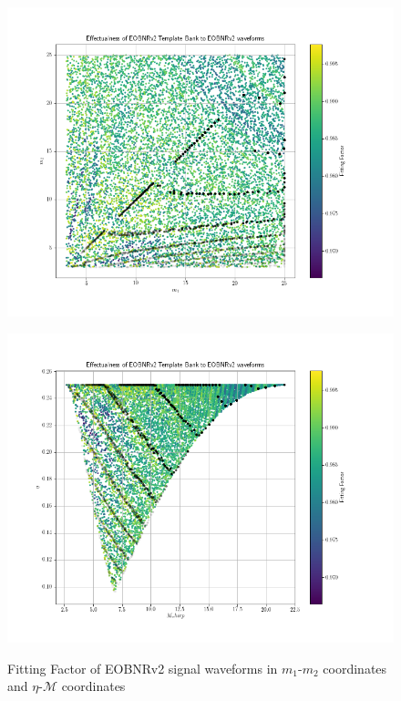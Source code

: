 \documentclass{article}
\begin{document}
\begin{figure}[h]
    \begin{minipage}{0.5\textwidth}
        \includegraphics[scale=0.3]{EffectualnessEOBNRv2.png}
        \label{fig:effectualnessEOBm1m2}
    \end{minipage}
    \begin{minipage}{0.5\textwidth}
        \includegraphics[scale=0.3]{EffectualnessEOBNRv2-eta-mchirp-coords.png}
        \label{fig:effectualnessEOBetamchirp}
    \end{minipage}
    \caption{Fitting Factor of EOBNRv2 signal waveforms in $m_1$-$m_2$
    coordinates and $\eta$-$\mathcal{M}$ coordinates}
    \label{fig:effectualnessEOB}
\end{figure}
\end{document}
